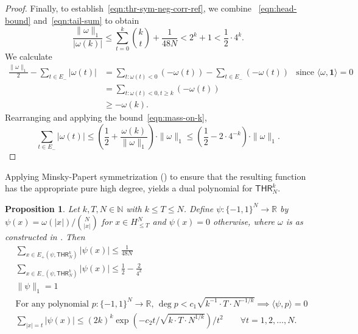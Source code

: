 \documentclass[11pt, letterpaper, fleqn]{article}
\newtheorem{proposition}[theorem]{Proposition}
\theoremstyle{plain}
\newcommand{\R}{\mathbb{R}}
\newcommand{\THR}{\mathsf{THR}}
\newcommand{\bits}{\{-1,1\}}
\newcommand{\N}{\mathbb{N}}
\begin{document}
\begin{proof}
Finally, to establish~\eqref{eqn:thr-sym-neg-corr-ref}, we combine ~\eqref{eqn:head-bound} and~\eqref{eqn:tail-sum} to obtain
\begin{equation} \label{eqn:mass-on-k}
\frac{\|\omega\|_1}{|\omega(k)|} \le \sum_{t = 0}^k \binom{k}{t} + \frac{1}{48 N} < 2^k + 1 < \frac{1}{2} \cdot 4^k.
\end{equation}
We calculate
\begin{align*}
\frac{\|\omega\|_1}{2} - \sum_{t \in E_-} |\omega(t)| &=  \sum_{t : \omega(t) < 0} (-\omega(t)) - \sum_{t \in E_-} (-\omega(t)) & \text{since $\langle \omega, \mathbf{1} \rangle = 0$}\\
&= \sum_{t \colon \omega(t) < 0, t \geq k} (-\omega(t)) \\
&\ge -\omega(k).
\end{align*}
Rearranging and applying the bound~\eqref{eqn:mass-on-k},
\[\sum_{t \in E_{-}} |\omega(t)| \le \left(\frac{1}{2} + \frac{\omega(k)}{\|\omega\|_1}\right) \cdot \|\omega\|_1 \le \left(\frac{1}{2} - 2 \cdot 4^{-k}\right) \cdot \|\omega\|_1.\]
\end{proof}



Applying Minsky-Papert symmetrization () to ensure that the resulting function has the appropriate pure high degree,  yields a dual polynomial for $\THR^k_N$.


\begin{proposition} \label{prop:thr-dual}
Let $k, T, N\in \N$ with $k \le T \le N$. Define $\psi : \bits^N \to \R$ by $\psi(x) = \omega(|x|) / \binom{N}{ |x|}$ for $x \in H_{\le T}^N$ and $\psi(x) = 0$ otherwise, where $\omega$ is as constructed in . Then
\begin{align}
&\sum_{x \in E_+(\psi, \THR^k_N)} |\psi(x)| \le \frac{1}{48  N}  \label{eqn:thr-pos-corr}\\
&\sum_{x \in E_-(\psi, \THR^k_N)} |\psi(x)| \le \frac{1}{2} - \frac{2}{4^k}  \label{eqn:thr-neg-corr} \\
&\|\psi\|_1 = 1   \label{eqn:thr-norm} \\
&\text{For any polynomial } p \colon \bits^N \to \R\text{, } \deg p < c_1 \sqrt{k^{-1} \cdot T \cdot N^{-1/k}} \implies \langle \psi, p \rangle = 0 \label{eqn:thr-phd} \\
&\sum_{|x| = t} |\psi(x)| \le (2k)^k \exp(-c_2 t / \sqrt{k \cdot T \cdot N^{1/k}})/t^2 \qquad \forall t = 1, 2, \dots, N.\label{eqn:thr-decay}
\end{align}
\end{proposition}
\end{document}
